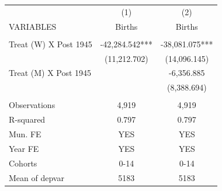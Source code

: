 \begin{tabular}{lcc} \hline
 & (1) & (2) \\
VARIABLES & Births & Births \\ \hline
 &  &  \\
Treat (W) X Post 1945 & -42,284.542*** & -38,081.075*** \\
 & (11,212.702) & (14,096.145) \\
Treat (M) X Post 1945 &  & -6,356.885 \\
 &  & (8,388.694) \\
 &  &  \\
Observations & 4,919 & 4,919 \\
R-squared & 0.797 & 0.797 \\
Mun. FE & YES & YES \\
Year FE & YES & YES \\
Cohorts & 0-14 & 0-14 \\
 Mean of depvar & 5183 & 5183 \\ \hline
\end{tabular}
